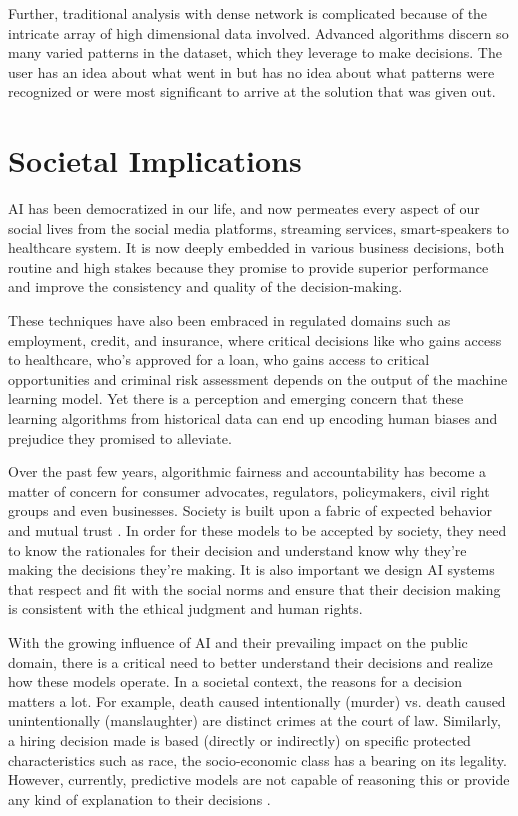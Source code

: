 Further, traditional analysis with dense network is complicated because of the intricate array of high dimensional data involved. Advanced algorithms discern so many varied patterns in the dataset, which they leverage to make decisions. The user has an idea about what went in but has no idea about what patterns were recognized or were most significant to arrive at the solution that was given out.

\section{Societal Implications}

AI has been democratized in our life, and now permeates every aspect of our social lives from the social media platforms, streaming services, smart-speakers to healthcare system. It is now deeply embedded in various business decisions, both routine and high stakes because they promise to provide superior performance and improve the consistency and quality of the decision-making. 

These techniques have also been embraced in regulated domains such as employment, credit, and insurance, where critical decisions like who gains access to healthcare, who’s approved for a loan, who gains access to critical opportunities and criminal risk assessment \cite{ainow2018} depends on the output of the machine learning model. Yet there is a perception and emerging concern that these learning algorithms from historical data can end up encoding human biases and prejudice they promised to alleviate.

Over the past few years, algorithmic fairness and accountability has become a matter of concern for consumer advocates, regulators, policymakers, civil right groups and even businesses. Society is built upon a fabric of expected behavior and mutual trust \cite{Lipton2018}. In order for these models to be accepted by society, they need to know the rationales for their decision and understand know why they’re making the decisions they’re making. It is also important we design AI systems that respect and fit with the social norms and ensure that their decision making is consistent with the ethical judgment and human rights.

With the growing influence of AI and their prevailing impact on the public domain, there is a critical need to better understand their decisions and realize how these models operate.  In a societal context, the reasons for a decision matters a lot. For example, death caused intentionally (murder) vs. death caused unintentionally (manslaughter) are distinct crimes at the court of law. Similarly, a hiring decision made is based (directly or indirectly) on specific protected characteristics such as race, the socio-economic class has a bearing on its legality. However, currently, predictive models are not capable of reasoning this or provide any kind of explanation to their decisions \cite{molnar}.

